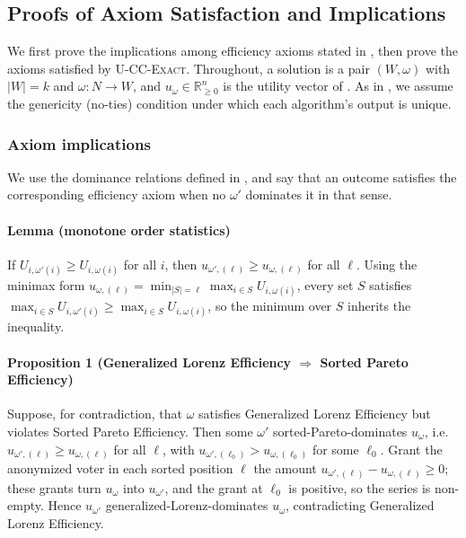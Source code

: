 \documentclass[letterpaper]{article} %
\newcommand{\Exact}{\textsc{U-CC-Exact}}
\begin{document}
\subsection{Proofs of Axiom Satisfaction and Implications}
\label{app:axiom-proofs}
We first prove the implications among efficiency axioms stated in , then prove the axioms satisfied by \Exact{}.
Throughout, a solution is a pair $(W,\omega)$ with $|W|=k$ and $\omega:N\to W$, and $u_\omega\in\mathbb{R}_{\ge0}^n$ is the utility vector of .
As in , we assume the genericity (no-ties) condition under which each algorithm's output is unique.

\subsubsection{Axiom implications} \label{app:axiom-implications}
We use the dominance relations defined in , and say that an outcome satisfies the corresponding efficiency axiom when no $\omega'$ dominates it in that sense.

\paragraph{Lemma (monotone order statistics)} If $U_{i,\omega'(i)}\ge U_{i,\omega(i)}$ for all $i$, then $u_{\omega',(\ell)}\ge u_{\omega,(\ell)}$ for all $\ell$.
Using the minimax form $u_{\omega,(\ell)}=\min_{|S|=\ell}\max_{i\in S}U_{i,\omega(i)}$, every set $S$ satisfies $\max_{i\in S}U_{i,\omega'(i)}\ge\max_{i\in S}U_{i,\omega(i)}$, so the minimum over $S$ inherits the inequality.

\paragraph{Proposition 1 (Generalized Lorenz Efficiency $\Rightarrow$ Sorted Pareto Efficiency)} Suppose, for contradiction, that $\omega$ satisfies Generalized Lorenz Efficiency but violates Sorted Pareto Efficiency.
Then some $\omega'$ sorted-Pareto-dominates $u_\omega$, i.e.\ $u_{\omega',(\ell)}\ge u_{\omega,(\ell)}$ for all $\ell$, with $u_{\omega',(\ell_0)}>u_{\omega,(\ell_0)}$ for some $\ell_0$.
Grant the anonymized voter in each sorted position $\ell$ the amount $u_{\omega',(\ell)}-u_{\omega,(\ell)}\ge0$; these grants turn $u_\omega$ into $u_{\omega'}$, and the grant at $\ell_0$ is positive, so the series is non-empty.
Hence $u_{\omega'}$ generalized-Lorenz-dominates $u_\omega$, contradicting Generalized Lorenz Efficiency.
\end{document}
